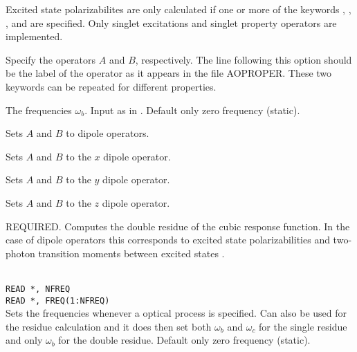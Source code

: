 Excited state polarizabilites are only calculated if one or more of the keywords
, , , and 
are specified.
Only singlet excitations and singlet property operators are implemented.

\begin{description}

\item[, ]
Specify the operators $A$ and $B$, respectively. The line following this
option should be the label of the operator as it appears in the file
AOPROPER. These two keywords can be repeated for different properties.

\item[]
The frequencies
$\omega_b$. Input as in .
Default only zero frequency (static).

\item{}
Sets $A$ and  $B$ to dipole operators.

\item{}
Sets $A$ and $B$ to the $x$ dipole operator.

\item{}
Sets $A$ and $B$ to the $y$ dipole operator.

\item{}
Sets $A$ and $B$ to the $z$ dipole operator.

\item{}
REQUIRED.
Computes the double residue of the cubic
response function.
In the case of dipole operators this corresponds to excited
state polarizabilities and two-photon transition
moments
between excited states \cite{djpnylhajcp105}.

\item{}\\
\verb|READ *, NFREQ|\\
\verb|READ *, FREQ(1:NFREQ)|\\
Sets the frequencies whenever a optical process is specified.
Can also be used for the residue calculation and it does then set
both $\omega_b$ and $\omega_c$ for the single residue and only
$\omega_b$ for the double residue.
Default only zero frequency (static).


\end{description}
